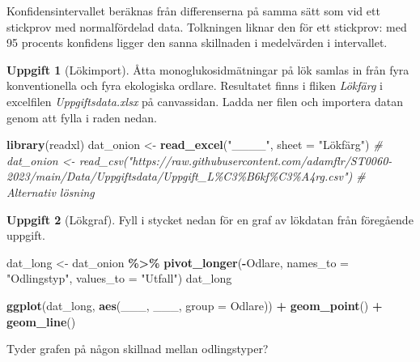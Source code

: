 \documentclass[
]{book}
\newenvironment{Shaded}{\begin{snugshade}}{\end{snugshade}}
\newcommand{\AttributeTok}[1]{\textcolor[rgb]{0.13,0.29,0.53}{#1}}
\newcommand{\CommentTok}[1]{\textcolor[rgb]{0.56,0.35,0.01}{\textit{#1}}}
\newcommand{\FunctionTok}[1]{\textcolor[rgb]{0.13,0.29,0.53}{\textbf{#1}}}
\newcommand{\NormalTok}[1]{#1}
\newcommand{\OtherTok}[1]{\textcolor[rgb]{0.56,0.35,0.01}{#1}}
\newcommand{\SpecialCharTok}[1]{\textcolor[rgb]{0.81,0.36,0.00}{\textbf{#1}}}
\newcommand{\StringTok}[1]{\textcolor[rgb]{0.31,0.60,0.02}{#1}}
\theoremstyle{definition}
\theoremstyle{definition}
\theoremstyle{definition}
\newtheorem{exercise}{Uppgift}[chapter]
\theoremstyle{definition}
\theoremstyle{remark}
\begin{document}
Konfidensintervallet beräknas från differenserna på samma sätt som vid ett stickprov med normalfördelad data. Tolkningen liknar den för ett stickprov: med 95 procents konfidens ligger den sanna skillnaden i medelvärden i intervallet.

\begin{exercise}[Lökimport]

Åtta monoglukosidmätningar på lök samlas in från fyra konventionella och fyra ekologiska ordlare. Resultatet finns i fliken \emph{Lökfärg} i excelfilen \emph{Uppgiftsdata.xlsx} på canvassidan. Ladda ner filen och importera datan genom att fylla i raden nedan.

\begin{Shaded}
\begin{Highlighting}[]
\FunctionTok{library}\NormalTok{(readxl)}
\NormalTok{dat\_onion }\OtherTok{\textless{}{-}} \FunctionTok{read\_excel}\NormalTok{(}\StringTok{"\_\_\_\_"}\NormalTok{, }\AttributeTok{sheet =} \StringTok{"Lökfärg"}\NormalTok{)}
\CommentTok{\# dat\_onion \textless{}{-} read\_csv("https://raw.githubusercontent.com/adamflr/ST0060{-}2023/main/Data/Uppgiftsdata/Uppgift\_L\%C3\%B6kf\%C3\%A4rg.csv") \# Alternativ lösning}
\end{Highlighting}
\end{Shaded}

\end{exercise}

\begin{exercise}[Lökgraf]
Fyll i stycket nedan för en graf av lökdatan från föregående uppgift.

\begin{Shaded}
\begin{Highlighting}[]
\NormalTok{dat\_long }\OtherTok{\textless{}{-}}\NormalTok{ dat\_onion }\SpecialCharTok{\%\textgreater{}\%} 
  \FunctionTok{pivot\_longer}\NormalTok{(}\SpecialCharTok{{-}}\NormalTok{Odlare, }\AttributeTok{names\_to =} \StringTok{"Odlingstyp"}\NormalTok{, }\AttributeTok{values\_to =} \StringTok{"Utfall"}\NormalTok{)}
\NormalTok{dat\_long}

\FunctionTok{ggplot}\NormalTok{(dat\_long, }\FunctionTok{aes}\NormalTok{(\_\_\_, \_\_\_, }\AttributeTok{group =}\NormalTok{ Odlare)) }\SpecialCharTok{+}
  \FunctionTok{geom\_point}\NormalTok{() }\SpecialCharTok{+}
  \FunctionTok{geom\_line}\NormalTok{()}
\end{Highlighting}
\end{Shaded}

Tyder grafen på någon skillnad mellan odlingstyper?
\end{exercise}
\end{document}
